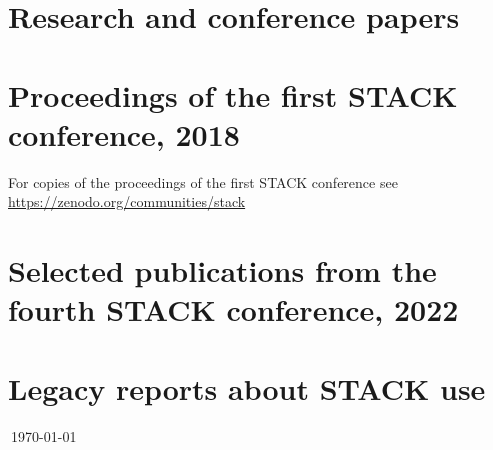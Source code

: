 \documentclass[11pt]{article}
\begin{document}
\section{Research and conference papers}
\nocite{Gratwick2020,Gratwick2023,Akveld2024,2018Mastery,Yoshitomi2018,Barbas2016,Nakamura2016,Sangwin2015KHDM}
\nocite{Rasila2016,Rasila2016b,Rasila2016c}
\nocite{Shirai2015a,Shirai2015b,Pavia2015,Nakamura2014,Shirai2014,Nakamura2013}
\nocite{Sangwin2012ICME,Sangwin2013HEA,Lowe2010,Sangwin2009Equality,Sangwin2010IGI,Nakamura2010b}
\nocite{Rasila2010,Sangwin2009Calculumus,Sangwin2009ICMI,Rasila2007}
\nocite{Sangwin2006CASAlgebra,WebALT2006,Sangwin2006UniServe,SangwinTMA03,SangwinHSkills02}
\nocite{lowe_mestel_2019,erskine_mestel_2018,Lowe2026,Paiva2017}
\nocite{Kinnear2022,Kinnear2022,Kontorovich2023,Kontorovich2023b,Kinnear2023CERME,Kinnear2024RME,Akveld2024,KinnearIannone2024PME}
\nocite{Kinnear2024FAME,Razeghpour2024FAME,Taha2024FAME}
\nocite{Iannone2026,Pinkernell2026a,Sangwin2026a}
\nocite{Chelleri2025,Doz2026}
\nocite{Wallace2026}
\nocite{Cameron2024,Cameron2025}
\printbibliography[heading=none]

\section{Proceedings of the first STACK conference, 2018}
For copies of the proceedings of the first STACK conference see \url{https://zenodo.org/communities/stack}

\nocite{harterich_jorg_2019_2582874,mai_tobias_2019_2582427,klischat_cosima_2019_2577116,kinnear_george_2019_2565969,zerva_konstantina_2019_2585816}
\nocite{bird_anja_2019_2563076,fath_julia_2019_2565860,altieri_mike_2019_2564881,bach_stephan_2019_2563803,miriam_weigel_2019_2563656,eckhoff_malte_2019_2561190}
\printbibliography[heading=none]

\section{Selected publications from the fourth STACK conference, 2022}
\nocite{2023-iJET-STACK-exams,2023-iJET-STACK-GeoGebra,2022-SeparatedConcerns,2022-HELM-Konstantina,HooperJones2023}
\printbibliography[heading=none]

\section{Legacy reports about STACK use}
\nocite{2010STACKReport,2013STACK-Brum,2015STACKReport,2019STACKReport,2022-STACK-Edinburgh}
\printbibliography[heading=none]


$~$\hfill{\tiny \today}
\end{document}
